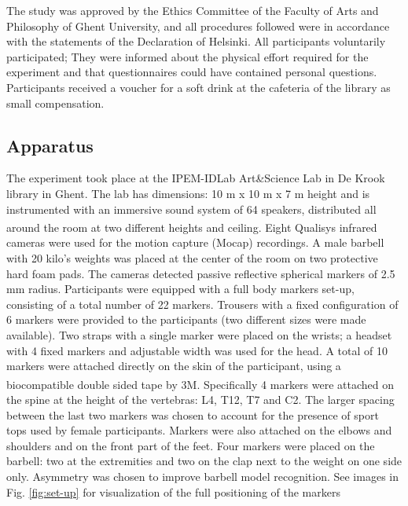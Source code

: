 \documentclass[10pt,letterpaper]{article}
\begin{document}
The study was approved by the Ethics Committee of the Faculty of Arts and Philosophy of Ghent University, and all procedures followed were in accordance with the statements of the Declaration of Helsinki. All participants voluntarily participated; They were informed about the physical effort required for the experiment and that questionnaires could have contained personal questions. Participants received a voucher for a soft drink at the cafeteria of the library as small compensation.


\subsection*{Apparatus}\label{sec:apparatus}
The experiment took place at the IPEM-IDLab Art\&Science Lab in De Krook library in Ghent. The lab has dimensions: 10 m x 10 m x 7 m height and is instrumented with an immersive sound system of 64 speakers, distributed all around the room at two different heights and ceiling. Eight Qualisys\textsuperscript{\textregistered} infrared cameras were used for the motion capture (Mocap) recordings. 
A male barbell with 20 kilo's weights was placed at the center of the room on two protective hard foam pads.
The cameras detected passive reflective spherical markers of 2.5 mm radius. Participants were equipped with a full body markers set-up, consisting of a total number of 22 markers. Trousers with a fixed configuration of 6 markers were provided to the participants (two different sizes were made available). Two straps with a single marker were placed on the wrists; a headset with 4 fixed markers and adjustable width was used for the head. A total of 10 markers were attached directly on the skin of the participant, using a biocompatible double sided tape by 3M\textsuperscript{\textregistered}. Specifically 4 markers were attached on the spine at the height of the vertebras: L4, T12, T7 and C2. The larger spacing between the last two markers was chosen to account for the presence of sport tops used by female participants. Markers were also attached on the elbows and shoulders and on the front part of the feet. 
Four markers were placed on the barbell: two at the extremities and two on the clap next to the weight on one side only. Asymmetry was chosen to improve barbell model recognition. 
See images in Fig. \ref{fig:set-up} for visualization of the full positioning of the markers
\end{document}
